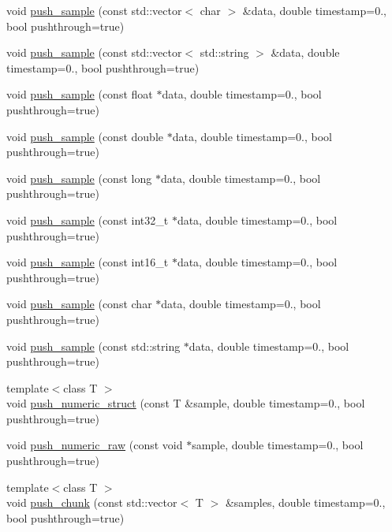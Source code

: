 \begin{DoxyCompactItemize}
void \hyperlink{classlsl_1_1stream__outlet_a510668a6adc032792e8bad06458e58eb}{push\+\_\+sample} (const std\+::vector$<$ char $>$ \&data, double timestamp=0., bool pushthrough=true)
\item 
void \hyperlink{classlsl_1_1stream__outlet_a59f69780061e6c8743a4cb566944033b}{push\+\_\+sample} (const std\+::vector$<$ std\+::string $>$ \&data, double timestamp=0., bool pushthrough=true)
\item 
void \hyperlink{classlsl_1_1stream__outlet_a24192e6e3416ad36154bc01be55334c3}{push\+\_\+sample} (const float $\ast$data, double timestamp=0., bool pushthrough=true)
\item 
void \hyperlink{classlsl_1_1stream__outlet_af0d747a0610be04501117f87c1b010e9}{push\+\_\+sample} (const double $\ast$data, double timestamp=0., bool pushthrough=true)
\item 
void \hyperlink{classlsl_1_1stream__outlet_a558af80f807399556a2483346e80b935}{push\+\_\+sample} (const long $\ast$data, double timestamp=0., bool pushthrough=true)
\item 
void \hyperlink{classlsl_1_1stream__outlet_aff1709d7bbf628e9b14d18444c7ac237}{push\+\_\+sample} (const int32\+\_\+t $\ast$data, double timestamp=0., bool pushthrough=true)
\item 
void \hyperlink{classlsl_1_1stream__outlet_ae67672d4aa82d500e0a192d38f64d6fe}{push\+\_\+sample} (const int16\+\_\+t $\ast$data, double timestamp=0., bool pushthrough=true)
\item 
void \hyperlink{classlsl_1_1stream__outlet_acbb1a237bb410d9794c1961922aca6ad}{push\+\_\+sample} (const char $\ast$data, double timestamp=0., bool pushthrough=true)
\item 
void \hyperlink{classlsl_1_1stream__outlet_a93e571140b73b4324051b8ef4b5606a4}{push\+\_\+sample} (const std\+::string $\ast$data, double timestamp=0., bool pushthrough=true)
\item 
{\footnotesize template$<$class T $>$ }\\void \hyperlink{classlsl_1_1stream__outlet_a18b2da34bdd1306ef926d97532c43f28}{push\+\_\+numeric\+\_\+struct} (const T \&sample, double timestamp=0., bool pushthrough=true)
\item 
void \hyperlink{classlsl_1_1stream__outlet_a5c394e995a86d03cb71c3d180f855681}{push\+\_\+numeric\+\_\+raw} (const void $\ast$sample, double timestamp=0., bool pushthrough=true)
\item 
{\footnotesize template$<$class T $>$ }\\void \hyperlink{classlsl_1_1stream__outlet_a58427b98e8a60e7d160534078f3e04f8}{push\+\_\+chunk} (const std\+::vector$<$ T $>$ \&samples, double timestamp=0., bool pushthrough=true)

\end{DoxyCompactItemize}
